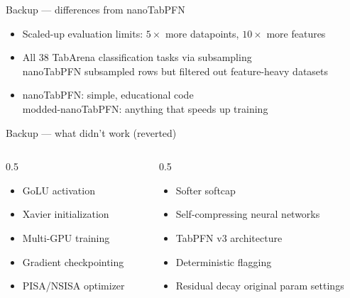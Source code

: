 \documentclass[aspectratio=169,10pt]{beamer}
\newcommand{\mut}[1]{{\color{muted}#1}}
\begin{document}
\begin{frame}{Backup --- differences from nanoTabPFN}
  \begin{itemize}
    \item Scaled-up evaluation limits: $5\times$ more datapoints, $10\times$ more features
    \item All 38 TabArena classification tasks via subsampling\\
      \mut{nanoTabPFN subsampled rows but filtered out feature-heavy datasets}
    \item nanoTabPFN: simple, educational code\\
      modded-nanoTabPFN: anything that speeds up training
  \end{itemize}
\end{frame}

\begin{frame}{Backup --- what didn't work (reverted)}
  \begin{columns}[T]
    \begin{column}{0.5\textwidth}
      \begin{itemize}
        \item GoLU activation
        \item Xavier initialization
        \item Multi-GPU training
        \item Gradient checkpointing
        \item PISA/NSISA optimizer
      \end{itemize}
    \end{column}
    \begin{column}{0.5\textwidth}
      \begin{itemize}
        \item Softer softcap
        \item Self-compressing neural networks
        \item TabPFN v3 architecture
        \item Deterministic flagging
        \item Residual decay original param settings
      \end{itemize}
    \end{column}
  \end{columns}
\end{frame}
\end{document}
